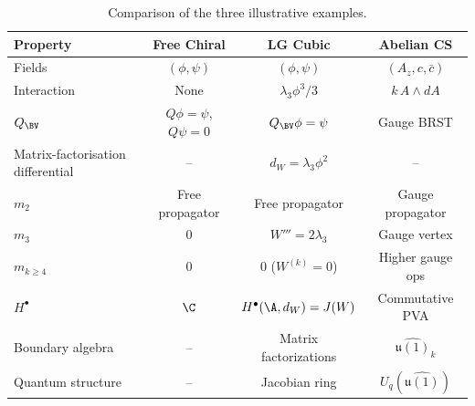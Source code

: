 \begin{table}[h]
\centering
\begin{tabular}{|l|c|c|c|}
\hline
\textbf{Property} & \textbf{Free Chiral} & \textbf{LG Cubic} & \textbf{Abelian CS} \\
\hline
Fields & $(\phi, \psi)$ & $(\phi, \psi)$ & $(A_z, c, \bar{c})$ \\
\hline
Interaction & None & $\lambda_3 \phi^3/3$ & $k\,A\wedge dA$ \\
\hline
$Q_{\BV}$ & $Q\phi=\psi$, $Q\psi=0$ & $Q_{\BV}\phi=\psi$ & Gauge BRST \\
\hline
Matrix-factorisation differential & -- & $d_W=\lambda_3\phi^2$ & -- \\
\hline
$m_2$ & Free propagator & Free propagator & Gauge propagator \\
\hline
$m_3$ & $0$ & $W'''=2\lambda_3$ & Gauge vertex \\
\hline
$m_{k\ge 4}$ & $0$ & $0$ (\(W^{(k)}=0\)) & Higher gauge ops \\
\hline
$H^\bullet$ & $\C$ & $H^\bullet(\A,d_W)=J(W)$ & Commutative PVA \\
\hline
Boundary algebra & -- & Matrix factorizations & $\widehat{\mathfrak{u}(1)}_k$ \\
\hline
Quantum structure & -- & Jacobian ring & $U_q(\widehat{\mathfrak{u}(1)})$ \\
\hline
\end{tabular}
\caption{Comparison of the three illustrative examples.}
\label{tab:examples_summary}
\end{table}
